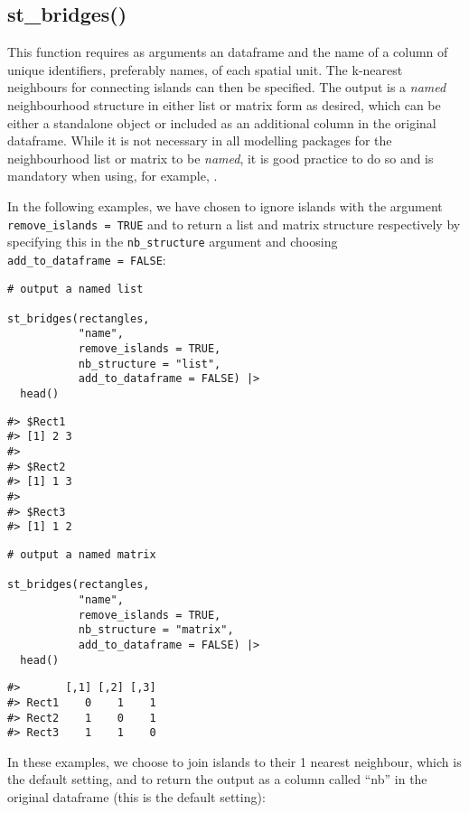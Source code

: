 \hypertarget{st_bridges}{%
\subsection{st\_bridges()}\label{st_bridges}}

This function requires as arguments an  dataframe and the name of a column of unique identifiers, preferably names, of each spatial unit. The k-nearest neighbours for connecting islands can then be specified. The output is a \emph{named} neighbourhood structure in either list or matrix form as desired, which can be either a standalone object or included as an additional column in the original  dataframe. While it is not necessary in all modelling packages for the neighbourhood list or matrix to be \emph{named}, it is good practice to do so and is mandatory when using, for example, .

In the following examples, we have chosen to ignore islands with the argument \texttt{remove\_islands\ =\ TRUE} and to return a list and matrix structure respectively by specifying this in the \texttt{nb\_structure} argument and choosing \texttt{add\_to\_dataframe\ =\ FALSE}:

\begin{verbatim}
# output a named list

st_bridges(rectangles, 
           "name", 
           remove_islands = TRUE, 
           nb_structure = "list", 
           add_to_dataframe = FALSE) |>
  head()
\end{verbatim}

\begin{verbatim}
#> $Rect1
#> [1] 2 3
#> 
#> $Rect2
#> [1] 1 3
#> 
#> $Rect3
#> [1] 1 2
\end{verbatim}

\begin{verbatim}
# output a named matrix

st_bridges(rectangles, 
           "name", 
           remove_islands = TRUE, 
           nb_structure = "matrix", 
           add_to_dataframe = FALSE) |> 
  head()
\end{verbatim}

\begin{verbatim}
#>       [,1] [,2] [,3]
#> Rect1    0    1    1
#> Rect2    1    0    1
#> Rect3    1    1    0
\end{verbatim}

In these examples, we choose to join islands to their 1 nearest
neighbour, which is the default setting, and to return the output as a column called ``nb'' in the original
 dataframe (this is the default setting):

